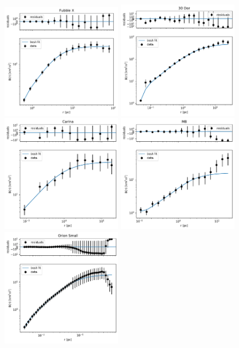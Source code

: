 \documentclass[fleqn,usenatbib, useAMS, a4paper]{mnras}
\begin{document}
\begin{figure}
\begin{multicols}{3}
\includegraphics[width=2in]{Figures/SFplots/Hubble X.pdf}\par
\includegraphics[width=2in]{Figures/SFplots/tarantula.pdf}\par
\end{multicols}
\begin{multicols}{3}
\includegraphics[width=2in]{Figures/SFplots/Carina.pdf}\par
\includegraphics[width=2in]{Figures/SFplots/M8.pdf}\par
\includegraphics[width=2in]{Figures/SFplots/OS.pdf}\par

\end{multicols}
\end{figure}
\end{document}
